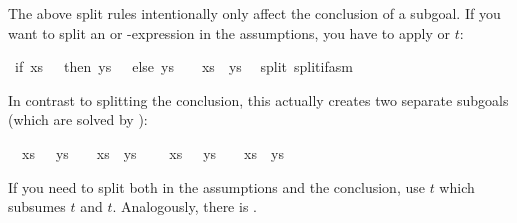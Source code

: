 \begin{isabellebody}
\begin{isamarkuptext}
The above split rules intentionally only affect the conclusion of a
subgoal.  If you want to split an  or -expression in
the assumptions, you have to apply  or
$t$:%
\end{isamarkuptext}%
\ {\isachardoublequote}if\ xs\ {\isacharequal}\ {\isacharbrackleft}{\isacharbrackright}\ then\ ys\ {\isasymnoteq}\ {\isacharbrackleft}{\isacharbrackright}\ else\ ys\ {\isacharequal}\ {\isacharbrackleft}{\isacharbrackright}\ {\isasymLongrightarrow}\ xs\ {\isacharat}\ ys\ {\isasymnoteq}\ {\isacharbrackleft}{\isacharbrackright}{\isachardoublequote}\isanewline
{}split\ split{\isacharunderscore}if{\isacharunderscore}asm{\isacharparenright}%
\begin{isamarkuptxt}%
\noindent
In contrast to splitting the conclusion, this actually creates two
separate subgoals (which are solved by ):
\begin{isabelle}%
\ {}{\isachardot}\ {\isasymlbrakk}xs\ {\isacharequal}\ {\isacharbrackleft}{\isacharbrackright}{\isacharsemicolon}\ ys\ {\isasymnoteq}\ {\isacharbrackleft}{\isacharbrackright}{\isasymrbrakk}\ {\isasymLongrightarrow}\ xs\ {\isacharat}\ ys\ {\isasymnoteq}\ {\isacharbrackleft}{\isacharbrackright}\isanewline
\ {}{\isachardot}\ {\isasymlbrakk}xs\ {\isasymnoteq}\ {\isacharbrackleft}{\isacharbrackright}{\isacharsemicolon}\ ys\ {\isacharequal}\ {\isacharbrackleft}{\isacharbrackright}{\isasymrbrakk}\ {\isasymLongrightarrow}\ xs\ {\isacharat}\ ys\ {\isasymnoteq}\ {\isacharbrackleft}{\isacharbrackright}%
\end{isabelle}
If you need to split both in the assumptions and the conclusion,
use $t$ which subsumes $t$ and
$t$. Analogously, there is .


\end{isamarkuptxt}
\end{isabellebody}
